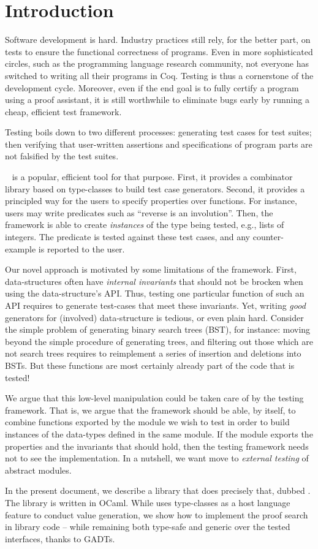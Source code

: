 \section{Introduction}
\label{sec:introduction}

Software development is hard. Industry practices still rely, for the better
part, on tests to ensure the functional correctness of programs. Even in more
sophisticated circles, such as the programming language research community, not
everyone has switched to writing all their programs in Coq. Testing is thus a
cornerstone of the development cycle. Moreover, even if the end goal is to fully
certify a program using a proof assistant, it is still worthwhile to eliminate
bugs early by running a cheap, efficient test framework.

Testing boils down to two different processes: generating test cases
for test suites; then verifying that user-written assertions and
specifications of program parts are not falsified by the test suites.

\qcheck{}~\cite{DBLP:conf/icfp/ClaessenH00} is a popular, efficient
tool for that purpose. First, it provides a combinator library based
on type-classes to build test case generators. Second, it provides
a principled way for the users to specify properties over
functions. For instance, users may write predicates such as ``reverse
is an involution''. Then, the \qcheck framework is able to create
\emph{instances} of the type being tested, e.g., lists of integers.
The predicate is tested against these test cases, and any
counter-example is reported to the user.

Our novel approach is motivated by some limitations of the \qcheck
framework.
%
First, data-structures often have \emph{internal invariants} that
should not be brocken when using the data-structure's API. Thus,
testing one particular function of such an API requires to generate
test-cases that meet these invariants.
%
Yet, writing \emph{good} generators for (involved) data-structure is
tedious, or even plain hard. Consider the simple problem of generating
binary search trees (BST), for instance: moving beyond the simple
procedure of generating trees, and filtering out those which are not
search trees requires to reimplement a series of insertion and
deletions into BSTs. But these functions are most certainly already
part of the code that is tested!
%

We argue that this low-level manipulation could be taken care of by
the testing framework. That is, we argue that the framework should be
able, by itself, to combine functions exported by the module we wish
to test in order to build instances of the data-types defined in the
same module. If the module exports the properties and the invariants
that should hold, then the testing framework needs not to see the
implementation.
%
In a nutshell, we want move to \emph{external testing} of abstract
modules.

In the present document, we describe a library that does precisely
that, dubbed \arti. The library is written in OCaml. While \qcheck
uses type-classes as a host language feature to conduct value
generation, we show how to implement the proof search in library
code -- while remaining both type-safe and generic over the
tested interfaces, thanks to GADTs.
